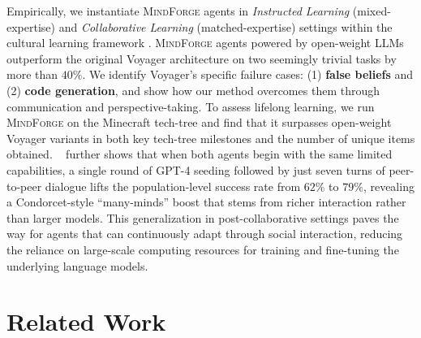 \documentclass{article}
\newcommand{\collabvoyager}[0]{\mbox{\textsc{MindForge}}\xspace}
\begin{document}
Empirically, we instantiate \collabvoyager agents in \textit{Instructed Learning} (mixed-expertise) and \textit{Collaborative Learning} (matched-expertise) settings within the cultural learning framework \citep{tomasello2016cultural}. \collabvoyager agents powered by open-weight LLMs outperform the original Voyager architecture \citep{wang2023voyager} on two seemingly trivial tasks by more than $40 \%$. We identify Voyager’s specific failure cases: (1) \textbf{false beliefs} and (2) \textbf{code generation}, and show how our method overcomes them through communication and perspective-taking. To assess lifelong learning, we run \collabvoyager on the Minecraft tech-tree and find that it surpasses open-weight Voyager variants in both key tech-tree milestones and the number of unique items obtained. ~ further shows that when both agents begin with the same limited capabilities, a single round of GPT-4 seeding followed by just seven turns of peer-to-peer dialogue lifts the population-level success rate from $62 \%$ to $79 \%$, revealing a Condorcet-style ``many-minds'' boost that stems from richer interaction rather than larger models. This generalization in post-collaborative settings paves the way for agents that can continuously adapt through social interaction, reducing the reliance on large-scale computing resources for training and fine-tuning the underlying language models.



\section{Related Work}\label{sec:related-work}
\end{document}
